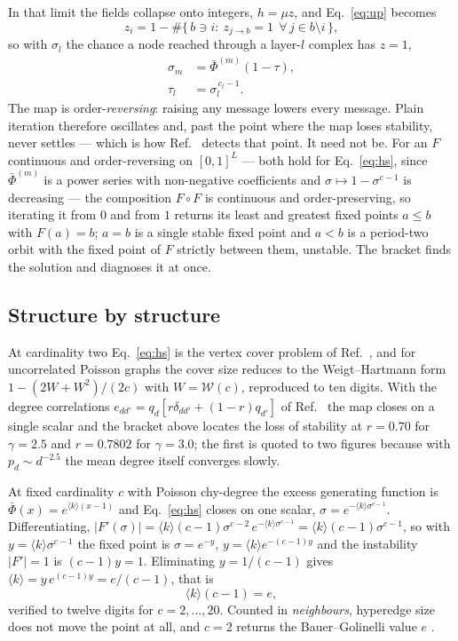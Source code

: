 \documentclass[aps,pre,twocolumn,superscriptaddress,floatfix]{revtex4-2}
\newcommand{\ave}[1]{\langle #1 \rangle}
\begin{document}
In that limit the fields collapse onto integers, $h=\mu z$, and
Eq.~\eqref{eq:up} becomes
\begin{equation}
  z_i=1-\#\big\{\,b\ni i:\ z_{j\to b}=1\ \ \forall\,j\in b\setminus i\,\big\},
  \label{eq:zhs}
\end{equation}
so with $\sigma_l$ the chance a node reached through a layer-$l$ complex has
$z=1$,
\begin{equation}
  \begin{split}
    \sigma_m&=\bar\Phi^{(m)}(1-\tau),\\
    \tau_l&=\sigma_l^{\,c_l-1}.
  \end{split}
  \label{eq:hs}
\end{equation}
The map is order-\emph{reversing}: raising any message lowers every message.
Plain iteration therefore oscillates and, past the point where the map loses
stability, never settles --- which is how Ref.~\cite{VW03} detects that point.
It need not be. For an $F$ continuous and order-reversing on $[0,1]^{L}$ ---
both hold for Eq.~\eqref{eq:hs}, since $\bar\Phi^{(m)}$ is a power series with
non-negative coefficients and $\sigma\mapsto1-\sigma^{c-1}$ is decreasing ---
the composition $F\circ F$ is continuous and order-preserving, so iterating it
from $0$ and from $1$ returns its least and greatest fixed points $a\leq b$ with
$F(a)=b$; $a=b$ is a single stable fixed
point and $a<b$ is a period-two orbit with the fixed point of $F$ strictly
between them, unstable. The bracket finds the solution and diagnoses it at once.

\subsection{Structure by structure}

At cardinality two Eq.~\eqref{eq:hs} is the vertex cover problem of
Ref.~\cite{VW03}, and for uncorrelated Poisson graphs the cover size reduces to
the Weigt--Hartmann form \cite{WH00} $1-(2W+W^2)/(2c)$ with $W=\mathcal{W}(c)$,
reproduced to ten digits. With the degree correlations $e_{dd'}=q_d[r\delta_{dd'}+(1-r)
q_{d'}]$ of Ref.~\cite{VW03} the map closes on a single scalar and the bracket
above locates the loss of stability at $r=0.70$ for $\gamma=2.5$ and $r=0.7802$
for $\gamma=3.0$; the first is quoted to two figures because with
$p_d\sim d^{-2.5}$ the mean degree itself converges slowly.

At fixed cardinality $c$ with Poisson chy-degree the excess generating function
is $\bar\Phi(x)=e^{\ave{k}(x-1)}$ and Eq.~\eqref{eq:hs} closes on one scalar,
$\sigma=e^{-\ave{k}\sigma^{c-1}}$. Differentiating,
$|F'(\sigma)|=\ave{k}(c-1)\sigma^{c-2}\,e^{-\ave{k}\sigma^{c-1}}
=\ave{k}(c-1)\sigma^{c-1}$, so with $y=\ave{k}\sigma^{c-1}$ the fixed point is
$\sigma=e^{-y}$, $y=\ave{k}e^{-(c-1)y}$ and the instability $|F'|=1$ is
$(c-1)y=1$. Eliminating $y=1/(c-1)$ gives
$\ave{k}=y\,e^{(c-1)y}=e/(c-1)$, that is
\begin{equation}
  \ave{k}(c-1)=e,
  \label{eq:kc}
\end{equation}
verified to twelve digits for $c=2,\dots,20$. Counted in \emph{neighbours},
hyperedge size does not move the point at all, and $c=2$ returns the
Bauer--Golinelli value $e$ \cite{BG01}.
\end{document}
